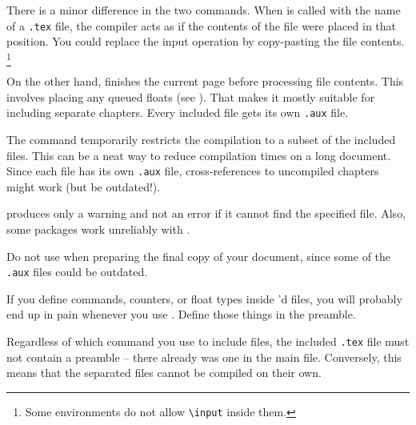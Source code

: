 There is a minor difference in the two commands.
When  is called with the name of a \verb|.tex| file,
the compiler acts as if the contents of the file were placed in that position.
You could replace the input operation by copy-pasting the file contents.%
\footnote{Some environments do not allow \texttt{\textbackslash input} inside them.}

On the other hand,  finishes the current page
before processing file contents.
This involves placing any queued floats (see ).
That makes it mostly suitable for including separate chapters.
Every included file gets its own \verb|.aux| file.

The  command temporarily restricts the compilation to a subset of the included files.
This can be a neat way to reduce compilation times on a long document.
Since each file has its own \verb|.aux| file,
cross-references to uncompiled chapters might work (but be outdated!).

\begin{ExampleCode}


\end{ExampleCode}

\begin{gotcha}
 produces only a warning and not an error if it cannot find the specified file.
Also, some packages work unreliably with .

Do not use  when preparing the final copy of your document,
since some of the \verb|.aux| files could be outdated.
\end{gotcha}

\begin{gotcha}
If you define commands, counters, or float types inside 'd files,
you will probably end up in pain whenever you use .
Define those things in the preamble.\footnotemark
\end{gotcha}

Regardless of which command you use to include files,
the included \verb|.tex| file must not contain a preamble --
there already was one in the main file.
Conversely, this means that the separated files cannot be compiled on their own.

